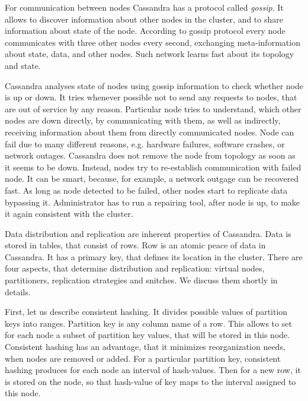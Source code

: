 For communication between nodes Cassandra has a protocol called \textit{gossip}.
It allows to discover information about other nodes in the cluster, and to share information about state of the node.
According to gossip protocol every node communicates with three other nodes every second, exchanging meta-information about state, data, and other nodes.
Such network learns fast about its topology and state.

Cassandra analyses state of nodes using gossip information to check whether node is up or down.
It tries whenever possible not to send any requests to nodes, that are out of service by any reason.
Particular node tries to understand, which other nodes are down directly, by communicating with them, as well as indirectly, receiving information about them from directly communicated nodes.
Node can fail due to many different reasons, e.g. hardware failures, software crashes, or network outages.
Cassandra does not remove the node from topology as soon as it seems to be down.
Instead, nodes try to re-establish communication with failed node.
It can be smart, because, for example, a network outgage can be recovered fast.
As long as node detected to be failed, other nodes start to replicate data bypassing it.
Administrator has to run a repairing tool, after node is up, to make it again consistent with the cluster.

Data distribution and replication are inherent properties of Cassandra.
Data is stored in tables, that consist of rows.
Row is an atomic peace of data in Cassandra.
It has a primary key, that defines its location in the cluster.
There are four aspects, that determine distribution and replication: virtual nodes, partitioners, replication strategies and snitches.
We discuss them shortly in details.

First, let us describe consistent hashing.
It divides possible values of partition keys into ranges.
Partition key is any column name of a row.
This allows to set for each node a subset of partition key values, that will be stored in this node.
Consistent hashing has an advantage, that it minimizes reorganization needs, when nodes are removed or added.
For a particular partition key, consistent hashing produces for each node an interval of hash-values.
Then for a new row, it is stored on the node, so that hash-value of key maps to the interval assigned to this node.


